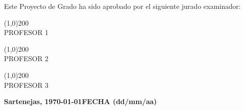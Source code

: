 \begin{titlepage}
\begin{center}
\begin{minipage}{\textwidth}
            Este Proyecto de Grado ha sido aprobado por el siguiente jurado examinador: \\
            
            \bigskip
            \bigskip
            
            \line(1,0){200} \\
            PROFESOR 1\\
            
            \bigskip
            \bigskip
            
            \line(1,0){200} \\
            PROFESOR 2 \\
            
            \bigskip
            \bigskip
            
            \line(1,0){200} \\
            PROFESOR 3 \\
        \end{minipage}
        
        \bigskip
        \bigskip
        \vfill
        
        {\large \bfseries Sartenejas, \today FECHA (dd/mm/aa)}
        
    \end{center}
\end{titlepage}

\pagebreak